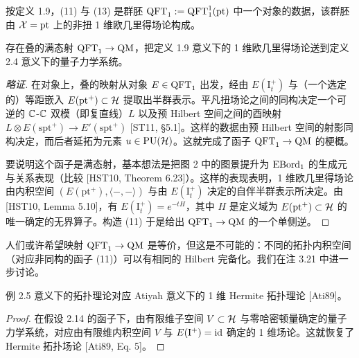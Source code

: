 按定义 1.9，(11) 与 (13) 是群胚 $\operatorname{QFT}_1:=\operatorname{QFT}^{1}_{1}(\mathrm{pt})$ 中一个对象的数据，该群胚由 $\mathcal{X}=\mathrm{pt}$ 上的非扭 1 维欧几里得场论构成。

\begin{hypothesis}
存在叠的满态射 $\operatorname{QFT}_1\to\operatorname{QM}$，把定义 1.9 意义下的 1 维欧几里得场论送到定义 2.4 意义下的量子力学系统。
\end{hypothesis}

\begin{proof}[略证]
在对象上，叠的映射从对象 $E\in\operatorname{QFT}_1$ 出发，经由 $E(\mathrm{I}^{+}_t)$ 与（一个选定的）等距嵌入 $E(\mathrm{pt}^{+})\subset\mathcal{H}$ 提取出半群表示。平凡扭场论之间的同构决定一个可逆的 $\mathbb{C}$-$\mathbb{C}$ 双模（即复直线）$L$ 以及预 Hilbert 空间之间的酉映射 $L\otimes E(\mathrm{spt}^{+})\to E'(\mathrm{spt}^{+})$ [ST11, §5.1]。这样的数据由预 Hilbert 空间的射影同构决定，而后者延拓为元素 $u\in\mathrm{PU}(\mathcal{H})$。这就完成了函子 $\operatorname{QFT}_1\to\operatorname{QM}$ 的梗概。

{\sloppy
要说明这个函子是满态射，基本想法是把图 2 中的图景提升为 $\operatorname{EBord}_1$ 的生成元与关系表现（比较 [HST10, Theorem 6.23]）。这样的表现表明，1 维欧几里得场论由内积空间 $(E(\mathrm{pt}^{+}),\langle-,-\rangle)$ 与由 $E(\mathrm{I}^{+}_t)$ 决定的自伴半群表示所决定。由 [HST10, Lemma 5.10]，有 $E(\mathrm{I}^{+}_t)=e^{-tH}$，其中 $H$ 是定义域为 $E(\mathrm{pt}^{+})\subset\mathcal{H}$ 的唯一确定的无界算子。构造 (11) 于是给出 $\operatorname{QFT}_1\to\operatorname{QM}$ 的一个单侧逆。\par}
\end{proof}

\begin{remark}[2.15]
人们或许希望映射 $\operatorname{QFT}_1\to\operatorname{QM}$ 是等价，但这是不可能的：不同的拓扑内积空间（对应非同构的函子 (11)）可以有相同的 Hilbert 完备化。我们在注 3.21 中进一步讨论。
\end{remark}

\begin{corollary}[2.16]
例 2.5 意义下的拓扑理论对应 Atiyah 意义下的 1 维 Hermite 拓扑理论 [Ati89]。
\end{corollary}

\begin{proof}
在假设 2.14 的函子下，由有限维子空间 $V\subset\mathcal{H}$ 与零哈密顿量确定的量子力学系统，对应由有限维内积空间 $V$ 与 $E(\mathrm{I}^{+})=\operatorname{id}$ 确定的 1 维场论。这就恢复了 Hermite 拓扑场论 [Ati89, Eq. 5]。
\end{proof}


